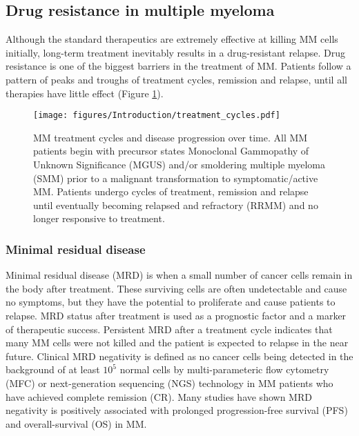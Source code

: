 \subsection{Drug resistance in multiple myeloma}
Although the standard therapeutics are extremely effective at killing MM cells initially, long-term treatment inevitably results in a drug-resistant relapse.
Drug resistance is one of the biggest barriers in the treatment of MM\@.
Patients follow a pattern of peaks and troughs of treatment cycles, remission and relapse, until all therapies have little effect (Figure \ref{fig:treatment_cycles}).
\begin{figure}[htb]
\centering
\texttt{[image: figures/Introduction/treatment\_cycles.pdf]}
\caption[MM treatment cycles]{MM treatment cycles and disease progression over time.
All MM patients begin with precursor states Monoclonal Gammopathy of Unknown Significance (MGUS) and/or smoldering multiple myeloma (SMM) prior to a malignant transformation to symptomatic/active MM.
Patients undergo cycles of treatment, remission and relapse until eventually becoming relapsed and refractory (RRMM) and no longer responsive to treatment.
}
\label{fig:treatment_cycles}
\end{figure}
\subsubsection{Minimal residual disease}
Minimal residual disease (MRD) is when a small number of cancer cells remain in the body after treatment.
These surviving cells are often undetectable and cause no symptoms, but they have the potential to proliferate and cause patients to relapse.
MRD status after treatment is used as a prognostic factor and a marker of therapeutic success.
Persistent MRD after a treatment cycle indicates that many MM cells were not killed and the patient is expected to relapse in the near future\cite{ding2021minimal}.
Clinical MRD negativity is defined as no cancer cells being detected in the background of at least $10^5$ normal cells by multi-parameteric flow cytometry (MFC) or next-generation sequencing (NGS) technology in MM patients who have achieved complete remission (CR)\cite{kumar2016international}.
Many studies have shown MRD negativity is positively associated with prolonged progression-free survival (PFS) and overall-survival (OS) in MM\cite{paiva2008multiparameter, martinez2014prognostic, munshi2020large}.


